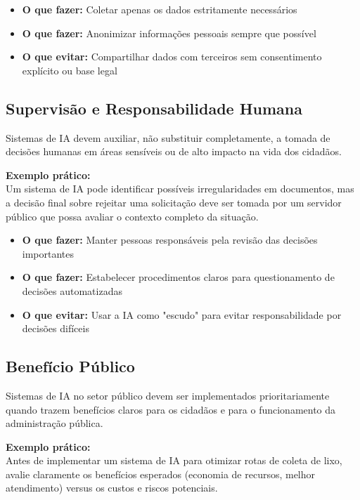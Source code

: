 \documentclass[12pt,a4paper]{article}
\begin{document}
\begin{itemize}
    \item \textbf{O que fazer:} Coletar apenas os dados estritamente necessários
    \item \textbf{O que fazer:} Anonimizar informações pessoais sempre que possível
    \item \textbf{O que evitar:} Compartilhar dados com terceiros sem consentimento explícito ou base legal
\end{itemize}

\subsection{Supervisão e Responsabilidade Humana}
Sistemas de IA devem auxiliar, não substituir completamente, a tomada de decisões humanas em áreas sensíveis ou de alto impacto na vida dos cidadãos.

\begin{tcolorbox}[example]
\textbf{Exemplo prático:} \\
Um sistema de IA pode identificar possíveis irregularidades em documentos, mas a decisão final sobre rejeitar uma solicitação deve ser tomada por um servidor público que possa avaliar o contexto completo da situação.
\end{tcolorbox}

\begin{itemize}
    \item \textbf{O que fazer:} Manter pessoas responsáveis pela revisão das decisões importantes
    \item \textbf{O que fazer:} Estabelecer procedimentos claros para questionamento de decisões automatizadas
    \item \textbf{O que evitar:} Usar a IA como "escudo" para evitar responsabilidade por decisões difíceis
\end{itemize}

\subsection{Benefício Público}
Sistemas de IA no setor público devem ser implementados prioritariamente quando trazem benefícios claros para os cidadãos e para o funcionamento da administração pública.

\begin{tcolorbox}[example]
\textbf{Exemplo prático:} \\
Antes de implementar um sistema de IA para otimizar rotas de coleta de lixo, avalie claramente os benefícios esperados (economia de recursos, melhor atendimento) versus os custos e riscos potenciais.
\end{tcolorbox}
\end{document}
